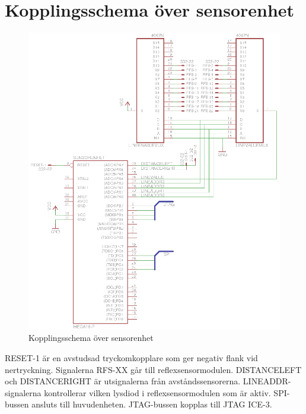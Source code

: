 \section{Kopplingsschema över sensorenhet}

\begin{figure}[h]
\center
\includegraphics{sensorenhet}
\caption{Kopplingsschema över sensorenhet}
\end{figure}

RESET-1 är en avstudsad tryckomkopplare som ger negativ flank vid nertryckning. Signalerna RFS-XX går till reflexsensormodulen. DISTANCELEFT och DISTANCERIGHT är utsignalerna från avståndssensorerna. LINEADDR-signalerna kontrollerar vilken lysdiod i reflexsensormodulen som är aktiv. SPI-bussen ansluts till huvudenheten. JTAG-bussen kopplas till JTAG ICE-3.

